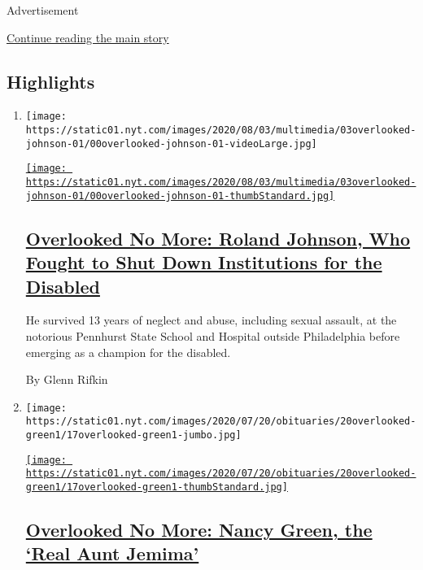 Advertisement

\protect\hyperlink{after-subheader}{Continue reading the main story}

\hypertarget{highlights}{%
\subsection{Highlights}\label{highlights}}

\begin{enumerate}
\def\labelenumi{\arabic{enumi}.}
\item
  \texttt{[image: https://static01.nyt.com/images/2020/08/03/multimedia/03overlooked-johnson-01/00overlooked-johnson-01-videoLarge.jpg]}

  \href{/2020/07/31/obituaries/roland-johnson-overlooked.html}{\texttt{[image: https://static01.nyt.com/images/2020/08/03/multimedia/03overlooked-johnson-01/00overlooked-johnson-01-thumbStandard.jpg]}}

  \hypertarget{overlooked-no-more-roland-johnson-who-fought-to-shut-down-institutions-for-the-disabled}{%
  \subsection{\texorpdfstring{\href{/2020/07/31/obituaries/roland-johnson-overlooked.html}{Overlooked
  No More: Roland Johnson, Who Fought to Shut Down Institutions for the
  Disabled}}{Overlooked No More: Roland Johnson, Who Fought to Shut Down Institutions for the Disabled}}\label{overlooked-no-more-roland-johnson-who-fought-to-shut-down-institutions-for-the-disabled}}

  He survived 13 years of neglect and abuse, including sexual assault,
  at the notorious Pennhurst State School and Hospital outside
  Philadelphia before emerging as a champion for the disabled.

  By Glenn Rifkin
\item
  \texttt{[image: https://static01.nyt.com/images/2020/07/20/obituaries/20overlooked-green1/17overlooked-green1-jumbo.jpg]}

  \href{/2020/07/17/obituaries/nancy-green-aunt-jemima-overlooked.html}{\texttt{[image: https://static01.nyt.com/images/2020/07/20/obituaries/20overlooked-green1/17overlooked-green1-thumbStandard.jpg]}}

  \hypertarget{overlooked-no-more-nancy-green-the-real-aunt-jemima}{%
  \subsection{\texorpdfstring{\href{/2020/07/17/obituaries/nancy-green-aunt-jemima-overlooked.html}{Overlooked
  No More: Nancy Green, the `Real Aunt
  Jemima'}}{Overlooked No More: Nancy Green, the `Real Aunt Jemima'}}\label{overlooked-no-more-nancy-green-the-real-aunt-jemima}}


\end{enumerate}
